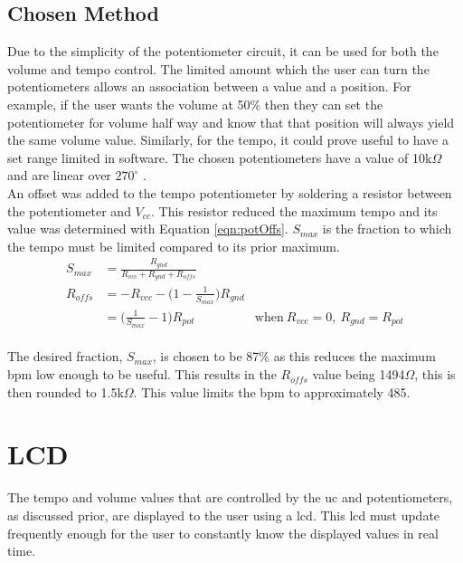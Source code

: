 \documentclass[12pt,a4paper]{report}
\begin{document}
\subsection{Chosen Method}
Due to the simplicity of the potentiometer circuit, it can be used for both the volume and tempo control. The limited amount which the user can turn the potentiometers allows an association between a value and a position. For example, if the user wants the volume at 50\% then they can set the potentiometer for volume half way and know that that position will always yield the same volume value. Similarly, for the tempo, it could prove useful to have a set range limited in software. The chosen potentiometers have a value of 10k$\Omega$ and are linear over $270^\circ$ \cite{pot}. \\
An offset was added to the tempo potentiometer by soldering a resistor between the potentiometer and $V_{cc}$. This resistor reduced the maximum tempo and its value was determined with Equation \ref{eqn:potOffs}. $S_{max}$ is the fraction to which the tempo must be limited compared to its prior maximum.
\begin{equation} \label{eqn:potOffs}
\begin{aligned}
S_{max} &= \frac{R_{gnd}}{R_{vcc} + R_{gnd} + R_{offs}} &\\
R_{offs} &= - R_{vcc} - \Big( 1 - \frac{1}{S_{max}} \Big) R_{gnd} &\\
&= \Big(\frac{1}{S_{max}} - 1 \Big) R_{pot} &\text{when}\ R_{vcc} = 0, \ R_{gnd} = R_{pot}
\end{aligned}
\end{equation}\\
The desired fraction, $S_{max}$, is chosen to be 87\% as this reduces the maximum \ac{bpm} low enough to be useful. This results in the $R_{offs}$ value being 1494$\Omega$, this is then rounded to 1.5k$\Omega$. This value limits the \ac{bpm} to approximately 485.
\section{LCD}
The tempo and volume values that are controlled by the \ac{uc} and potentiometers, as discussed prior, are displayed to the user using a \ac{lcd}. This \ac{lcd} must update frequently enough for the user to constantly know the displayed values in real time.
\end{document}
